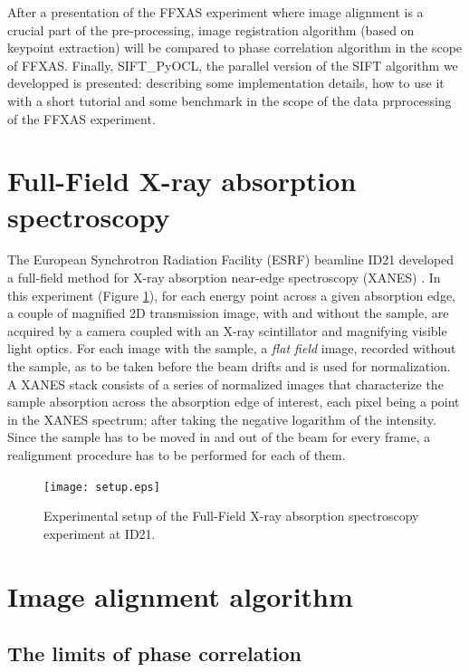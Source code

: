 \documentclass[preprint]{iucr}
\begin{document}
After a presentation of the FFXAS experiment where image alignment is a crucial
part of the pre-processing, image registration algorithm (based on keypoint
extraction) will be compared to phase correlation algorithm in the
scope of FFXAS. 
Finally, SIFT\_PyOCL, the parallel version of the SIFT algorithm  we developped
is presented: describing some implementation details, how to use it with a short
tutorial and some benchmark in the scope of the data prprocessing of the  FFXAS
experiment.


\section{Full-Field X-ray absorption spectroscopy}
The European Synchrotron Radiation Facility (ESRF) beamline ID21 developed a
full-field method for X-ray absorption near-edge spectroscopy
(XANES) \cite{andrade,fullfield}. 
In this experiment (Figure \ref{setup}), for each energy point across a given
absorption edge, a couple of magnified 2D transmission image, with and
without the sample, are acquired by a camera coupled with an 
X-ray scintillator and magnifying visible light optics.
For each image with the sample, a \emph{flat field} image, recorded
without the sample, as to be taken before the beam drifts and is used for
normalization.
A XANES stack consists of a series of normalized images that characterize the
sample absorption across the absorption edge of interest, each pixel being a
point in the XANES spectrum; after taking the negative logarithm of the
intensity.
Since the sample has to be moved in and out of the beam for every frame, a
realignment procedure has to be performed for each of them.

\begin{figure}
\begin{center}
\texttt{[image: setup.eps]}
\caption{\label{setup} Experimental setup of the Full-Field X-ray absorption
spectroscopy experiment at ID21.}
\end{center}
\end{figure}

\section{Image alignment algorithm}

\subsection{The limits of phase correlation}
\end{document}
